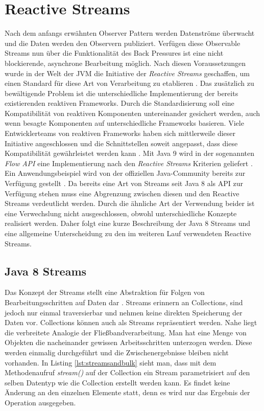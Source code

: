 \section{Reactive Streams}
Nach dem anfangs erwähnten Observer Pattern werden Datenströme überwacht und die Daten werden den Observern publiziert. Verfügen diese Observable Streams nun über die Funktionalität des Back Pressures ist eine nicht blockierende, asynchrone Bearbeitung möglich. Nach diesen Voraussetzungen wurde in der Welt der JVM die Initiative der \textit{Reactive Streams} geschaffen, um einen Standard für diese Art von Verarbeitung zu etablieren \cite{rsmain}. Das zusätzlich zu bewältigende Problem ist die unterschiedliche Implementierung der bereits existierenden reaktiven Frameworks. Durch die Standardisierung soll eine Kompatibilität von reaktiven Komponenten untereinander gesichert werden, auch wenn besagte Komponenten auf unterschiedliche Frameworks basieren. Viele Entwicklerteams von reaktiven Frameworks haben sich mittlerweile dieser Initiative angeschlossen und die Schnittstellen soweit angepasst, dass diese Kompatibilität gewährleistet werden kann \cite{rslsting}. Mit Java 9 wird in der sogenannten \textit{Flow API} eine Implementierung nach den \textit{Reactive Streams} Kriterien geliefert \cite{flowdoc}. Ein Anwendungsbeispiel wird von der offiziellen Java-Community bereits zur Verfügung gestellt \cite{flowexmpl}. Da bereits eine Art von Streams seit Java 8 als API zur Verfügung stehen muss eine Abgrenzung zwischen diesen und den Reactive Streams verdeutlicht werden. Durch die ähnliche Art der Verwendung beider ist eine Verwechslung nicht ausgeschlossen, obwohl unterschiedliche Konzepte realisiert werden. Daher folgt eine kurze Beschreibung der Java 8 Streams und eine allgemeine Unterscheidung zu den im weiteren Lauf verwendeten Reactive Streams. 
\subsection{Java 8 Streams}
Das Konzept der Streams stellt eine Abstraktion für Folgen von Bearbeitungsschritten auf Daten dar \cite{Inden.2015}. Streams erinnern an Collections, sind jedoch nur einmal traversierbar und nehmen keine direkten Speicherung der Daten vor. Collections können auch als Streams repräsentiert werden. Nahe liegt die verbreitete Analogie der Fließbandverarbeitung. Man hat eine Menge von Objekten die nacheinander gewissen Arbeitsschritten unterzogen werden. Diese werden einmalig durchgeführt und die Zwischenergebnisse bleiben nicht vorhanden. In Listing \ref{lst:streamsandbulk} sieht man, dass mit dem Methodenaufruf \textit{stream()} auf der Collection ein Stream parametrisiert auf den selben Datentyp wie die Collection erstellt werden kann. Es findet keine Änderung an den einzelnen Elemente statt, denn es wird nur das Ergebnis der Operation ausgegeben.


